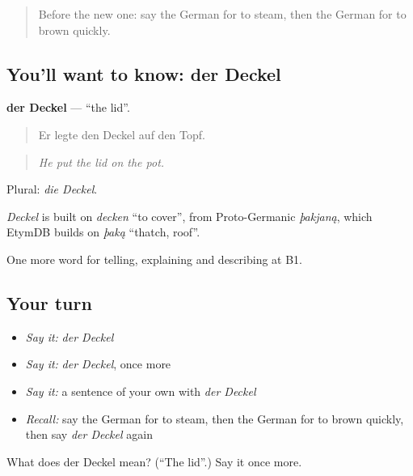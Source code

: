 \label{lesson:GE-C327-deckel}



\begin{quote}
Before the new one: say the German for to steam, then the German for to brown quickly.
\end{quote}

\subsection*{You'll want to know: der Deckel}
\textbf{der Deckel} — \textquotedblleft{}the lid\textquotedblright{}.

\begin{quote}
Er legte den Deckel auf den Topf.
\end{quote}

\begin{quote}
\emph{He put the lid on the pot.}
\end{quote}

Plural: \emph{die Deckel}.

\begin{cousinweb}
\emph{Deckel} is built on \emph{decken} \textquotedblleft{}to cover\textquotedblright{}, from Proto-Germanic \emph{þakjaną}, which EtymDB builds on \emph{þaką} \textquotedblleft{}thatch, roof\textquotedblright{}.
\end{cousinweb}

\begin{grammarlens}[title={What you've built}]
One more word for telling, explaining and describing at B1.
\end{grammarlens}

\subsection*{Your turn}
\begin{itemize}
\raggedright
  \item \emph{Say it:} \emph{der Deckel}
  \item \emph{Say it:} \emph{der Deckel}, once more
  \item \emph{Say it:} a sentence of your own with \emph{der Deckel}
  \item \emph{Recall:} say the German for to steam, then the German for to brown quickly, then say \emph{der Deckel} again
\end{itemize}

\begin{tcolorbox}[breakable,colback=teal!4,colframe=teal!35!black,title={Before you move on}]
What does der Deckel mean? (\textquotedblleft{}The lid\textquotedblright{}.) Say it once more.
\end{tcolorbox}

